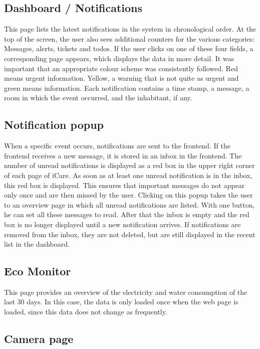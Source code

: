 \subsection{Dashboard / Notifications}

This page lists the latest notifications in the system in chronological order. 
At the top of the screen, the user also sees additional counters for the various categories: Messages, alerts, tickets and todos. If the user clicks on one of these four fields, a corresponding page appears, which displays the data in more detail.
It was important that an appropriate colour scheme was consistently followed.
Red means urgent information. Yellow, a warning that is not quite as urgent and green means information.
Each notification contains a time stamp, a message, a room in which the event occurred, and the inhabitant, if any.

\subsection{Notification popup}

When a specific event occurs, notifications are sent to the frontend. If the frontend receives a new message, it is stored in an inbox in the frontend. The number of unread notifications is displayed as a red box in the upper right corner of each page of iCare. As soon as at least one unread notification is in the inbox, this red box is displayed. This ensures that important messages do not appear only once and are then missed by the user.
Clicking on this popup takes the user to an overview page in which all unread notifications are listed. With one button, he can set all these messages to read. After that the inbox is empty and the red box is no longer displayed until a new notification arrives.
If notifications are removed from the inbox, they are not deleted, but are still displayed in the recent list in the dashboard.


\subsection{Eco Monitor}

This page provides an overview of the electricity and water consumption of the last 30 days.
In this case, the data is only loaded once when the web page is loaded, since this data does not change as frequently.



\subsection{Camera page}

